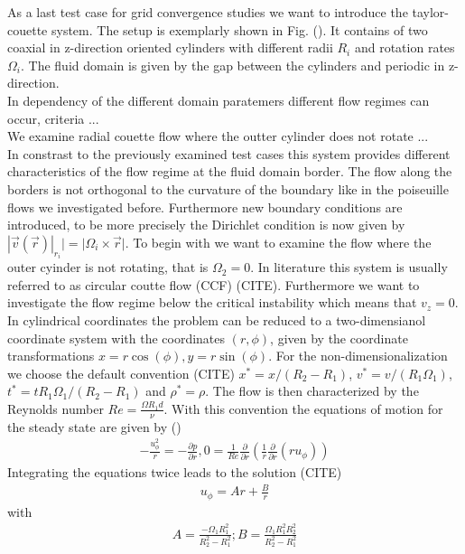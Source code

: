 As a last test case for grid convergence studies we want to introduce the taylor-couette system.
The setup is exemplarly shown in Fig. (). It contains of two coaxial in z-direction oriented cylinders
with different radii $R_i$ and rotation rates $\Omega_i$. The fluid domain is given by the gap between the cylinders and
periodic in z-direction.\\
In dependency of the different domain paratemers different flow regimes can occur, criteria ...\\
We examine radial couette flow where the outter cylinder does not rotate ...\\
In constrast to the previously examined test cases this system provides different characteristics
of the flow regime at the fluid domain border. The flow along the borders is not orthogonal to the curvature of
the boundary like in the poiseuille flows we investigated before. Furthermore  new boundary
conditions are introduced, to be more precisely the Dirichlet condition is now given by $|\vec{v}(\vec{r})|_{r_i} | = |\Omega_i \times \vec{r}|$.
To begin with we want to examine the flow where the outer cyinder is not rotating, that is $\Omega_2 = 0$.
In literature this system is usually referred to as circular coutte flow (CCF) (CITE). Furthermore we want to investigate the flow regime
below the critical instability which means that $v_z=0$. In cylindrical coordinates the problem can be reduced to a two-dimensianol coordinate system with
the coordinates $(r, \phi)$, given by the coordinate transformations $x=r\cos(\phi), y = r\sin(\phi)$.
For the non-dimensionalization we choose the default convention (CITE) $x^*=x/(R_2 - R_1)$, $v^*=v/(R_1\Omega_1)$, $t^*=tR_1\Omega_1/(R_2-R_1)$ and $\rho^*=\rho$.
The flow is then characterized by the Reynolds number $Re = \frac{\Omega R_1d}{\nu}$. With this convention the equations of motion for the steady state are given by ()
\begin{align}
    -\frac{u^2_\phi}{r} = - \frac{\partial p}{\partial r}, 0 = \frac{1}{Re}\frac{\partial}{\partial r}\left(\frac{1}{r}\frac{\partial}{\partial r}(r u_\phi)\right)
\end{align}
Integrating the equations twice leads to the solution (CITE)
\begin{align}
    u_\phi = Ar + \frac{B}{r}
\end{align}
with
\begin{align}
    A = \frac{-\Omega_1R_1^2}{R^2_2 - R^2_1} ; B = \frac{\Omega_1R^2_1 R^2_2}{R^2_2 - R^2_1}
\end{align}


